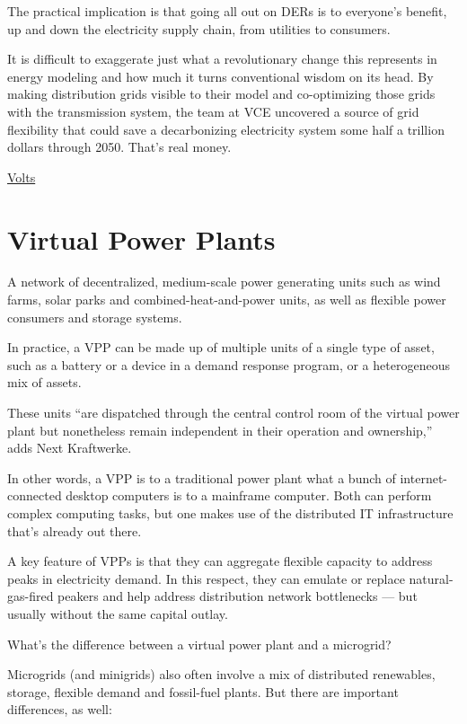 \documentclass[
]{book}
\begin{document}
The practical implication is that going all out on DERs is to everyone's benefit, up and down the electricity supply chain, from utilities to consumers.

It is difficult to exaggerate just what a revolutionary change this represents in energy modeling and how much it turns conventional wisdom on its head. By making distribution grids visible to their model and co-optimizing those grids with the transmission system, the team at VCE uncovered a source of grid flexibility that could save a decarbonizing electricity system some half a trillion dollars through 2050. That's real money.

\href{https://www.volts.wtf/p/rooftop-solar-and-home-batteries}{Volts}

\hypertarget{virtual-power-plants}{%
\chapter{Virtual Power Plants}\label{virtual-power-plants}}

A network of decentralized, medium-scale power generating units such as wind farms, solar parks and combined-heat-and-power units, as well as flexible power consumers and storage systems.

In practice, a VPP can be made up of multiple units of a single type of asset, such as a battery or a device in a demand response program, or a heterogeneous mix of assets.

These units ``are dispatched through the central control room of the virtual power plant but nonetheless remain independent in their operation and ownership,'' adds Next Kraftwerke.

In other words, a VPP is to a traditional power plant what a bunch of internet-connected desktop computers is to a mainframe computer. Both can perform complex computing tasks, but one makes use of the distributed IT infrastructure that's already out there.

A key feature of VPPs is that they can aggregate flexible capacity to address peaks in electricity demand. In this respect, they can emulate or replace natural-gas-fired peakers and help address distribution network bottlenecks --- but usually without the same capital outlay.

What's the difference between a virtual power plant and a microgrid?

Microgrids (and minigrids) also often involve a mix of distributed renewables, storage, flexible demand and fossil-fuel plants. But there are important differences, as well:
\end{document}
